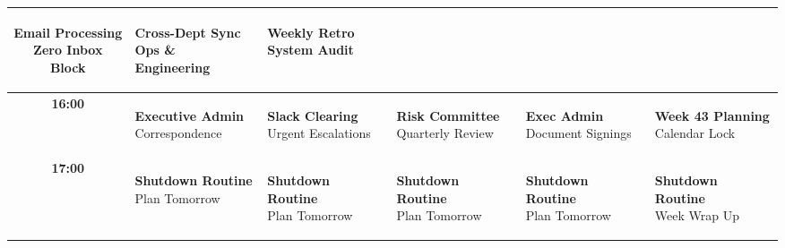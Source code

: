 \documentclass[10pt, landscape]{article}
\begin{document}
\begin{minipage}[t]{0.72\linewidth}
\begin{tabularx}{\linewidth}{|c|>{\raggedright\arraybackslash}X|>{\raggedright\arraybackslash}X|>{\raggedright\arraybackslash}X|>{\raggedright\arraybackslash}X|>{\raggedright\arraybackslash}X|}
    \colorbox{AdminBg}{\parbox[t]{0.92\linewidth}{\tiny\color{AdminTxt}\textbf{Email Processing}\\Zero Inbox Block}} &
    \colorbox{MeetingBg}{\parbox[t]{0.92\linewidth}{\tiny\color{MeetingTxt}\textbf{Cross-Dept Sync}\\Ops \& Engineering}} &
    \colorbox{DeepWorkBg}{\parbox[t]{0.92\linewidth}{\tiny\color{DeepWorkTxt}\textbf{Weekly Retro}\\System Audit}} \\
    \hline
    \textbf{16:00} &
    \colorbox{AdminBg}{\parbox[t]{0.92\linewidth}{\tiny\color{AdminTxt}\textbf{Executive Admin}\\Correspondence}} &
    \colorbox{AdminBg}{\parbox[t]{0.92\linewidth}{\tiny\color{AdminTxt}\textbf{Slack Clearing}\\Urgent Escalations}} &
    \colorbox{MeetingBg}{\parbox[t]{0.92\linewidth}{\tiny\color{MeetingTxt}\textbf{Risk Committee}\\Quarterly Review}} &
    \colorbox{AdminBg}{\parbox[t]{0.92\linewidth}{\tiny\color{AdminTxt}\textbf{Exec Admin}\\Document Signings}} &
    \colorbox{AdminBg}{\parbox[t]{0.92\linewidth}{\tiny\color{AdminTxt}\textbf{Week 43 Planning}\\Calendar Lock}} \\
    \hline
    \textbf{17:00} &
    \colorbox{PersonalBg}{\parbox[t]{0.92\linewidth}{\tiny\color{PersonalTxt}\textbf{Shutdown Routine}\\Plan Tomorrow}} &
    \colorbox{PersonalBg}{\parbox[t]{0.92\linewidth}{\tiny\color{PersonalTxt}\textbf{Shutdown Routine}\\Plan Tomorrow}} &
    \colorbox{PersonalBg}{\parbox[t]{0.92\linewidth}{\tiny\color{PersonalTxt}\textbf{Shutdown Routine}\\Plan Tomorrow}} &
    \colorbox{PersonalBg}{\parbox[t]{0.92\linewidth}{\tiny\color{PersonalTxt}\textbf{Shutdown Routine}\\Plan Tomorrow}} &
    \colorbox{PersonalBg}{\parbox[t]{0.92\linewidth}{\tiny\color{PersonalTxt}\textbf{Shutdown Routine}\\Week Wrap Up}} \\
    \hline
  \end{tabularx}

\end{minipage}

\newpage

\end{document}
